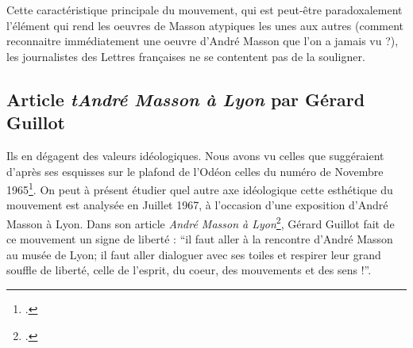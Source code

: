 	Cette caractéristique principale du mouvement, qui est peut-être paradoxalement l’élément qui rend les oeuvres de Masson atypiques les unes aux autres (comment reconnaitre immédiatement une oeuvre d’André Masson que l’on a jamais vu ?), les journalistes des Lettres françaises ne se contentent pas de la souligner. 

	\subsection{Article \emph{tAndré Masson à Lyon} par Gérard Guillot }

Ils en dégagent des valeurs idéologiques. Nous avons vu celles que suggéraient d’après ses esquisses sur le plafond de l’Odéon celles du numéro de Novembre 1965\footcite{sivous}. On peut à présent étudier quel autre axe idéologique cette esthétique du mouvement est analysée en Juillet 1967, à l’occasion d’une exposition d’André Masson à Lyon. Dans son article \emph{André Masson à Lyon}\footcite{massonlyon}, Gérard Guillot fait de ce mouvement un signe de liberté : \enquote{il faut aller à la rencontre d’André Masson au musée de Lyon; il faut aller dialoguer avec ses toiles et respirer leur grand souffle de liberté, celle de l’esprit, du coeur, des mouvements et des sens !}. 

